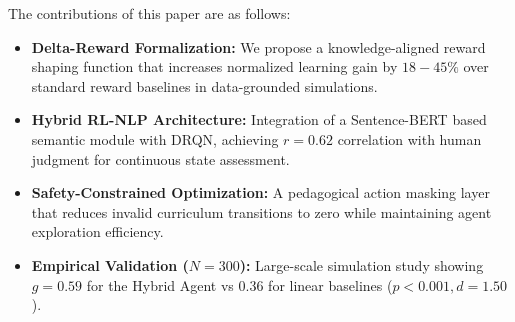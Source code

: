 \documentclass[conference]{IEEEtran}
\begin{document}
The contributions of this paper are as follows:
\begin{itemize}
    \item \textbf{Delta-Reward Formalization:} We propose a knowledge-aligned reward shaping function that increases normalized learning gain by $18-45\%$ over standard reward baselines in data-grounded simulations.
    \item \textbf{Hybrid RL-NLP Architecture:} Integration of a Sentence-BERT based semantic module with DRQN, achieving $r=0.62$ correlation with human judgment for continuous state assessment.
    \item \textbf{Safety-Constrained Optimization:} A pedagogical action masking layer that reduces invalid curriculum transitions to zero while maintaining agent exploration efficiency.
    \item \textbf{Empirical Validation ($N=300$):} Large-scale simulation study showing $g=0.59$ for the Hybrid Agent vs $0.36$ for linear baselines ($p < 0.001, d = 1.50$).
\end{itemize}
\begin{center}
\end{center}
\end{document}
